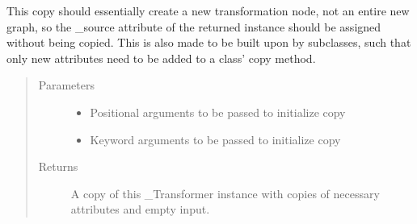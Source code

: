 \documentclass[letterpaper,10pt,english]{sphinxmanual}
\begin{document}
\begin{fulllineitems}
\begin{fulllineitems}
This copy should essentially create a new transformation node, not an
entire new graph, so the \_source attribute of the returned instance
should be assigned without being copied. This is also made to be built
upon by subclasses, such that only new attributes need to be added to
a class’ copy method.
\begin{quote}\begin{description}
\item[{Parameters}] \leavevmode\begin{itemize}
\item {} 
 \textendash{} Positional arguments to be passed to initialize copy

\item {} 
 \textendash{} Keyword arguments to be passed to initialize copy

\end{itemize}

\item[{Returns}] \leavevmode
A copy of this \_Transformer instance with copies of necessary
attributes and empty input.

\end{description}\end{quote}

\end{fulllineitems}


\end{fulllineitems}

\end{document}
